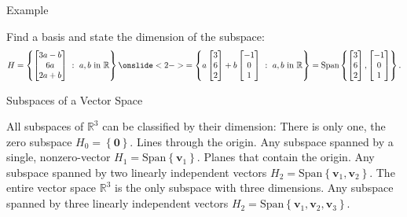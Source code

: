 \documentclass[xcolor=dvipsnames,aspectratio=169,t]{beamer}
\begin{document}
\begin{frame}{Example}
\medskip

  Find a basis and state the dimension of the subspace:
  \[ H = \left\{ \begin{bmatrix} 3a - b \\ 6a \\ 2a+b \end{bmatrix}
    \ : \ a, b \mbox{ in } \mathbb{R} \right\}
  \onslide<2->{
  =\left\{
    a \begin{bmatrix} 3 \\ 6 \\ 2 \end{bmatrix}
  + b \begin{bmatrix} -1 \\ 0 \\ 1 \end{bmatrix}
    \ : \ a, b \mbox{ in } \mathbb{R} \right\}
  = \text{Span}
    \left\{
    \begin{bmatrix} 3 \\ 6 \\ 2 \end{bmatrix},
    \begin{bmatrix} -1 \\ 0 \\ 1 \end{bmatrix}
    \right\}.
  }
  \]
  
\end{frame}

\begin{frame}{Subspaces of a Vector Space}

{\small All subspaces of $\mathbb{R}^3$ can be classified by their dimension:
\bi
\ii {} There is only one, the zero subspace $H_0 = \left\{ \mathbf{0} \right\}$.
\ii {} Lines through the origin. Any subspace spanned by a single, nonzero-vector $H_1 = \mbox{Span} \left\{ \mathbf{v}_1 \right\}$. 
\ii {} Planes that contain the origin. Any subspace spanned by two linearly independent vectors $H_2 = \mbox{Span} \left\{ \mathbf{v}_1, \mathbf{v}_2  \right\}$. 
\ii {} The entire vector space $\mathbb{R}^3$ is the only subspace with three dimensions. Any subspace spanned by three linearly independent vectors $H_2 = \mbox{Span} \left\{ \mathbf{v}_1, \mathbf{v}_2, \mathbf{v}_3  \right\}$. 
\ei}


\end{frame}
\end{document}
